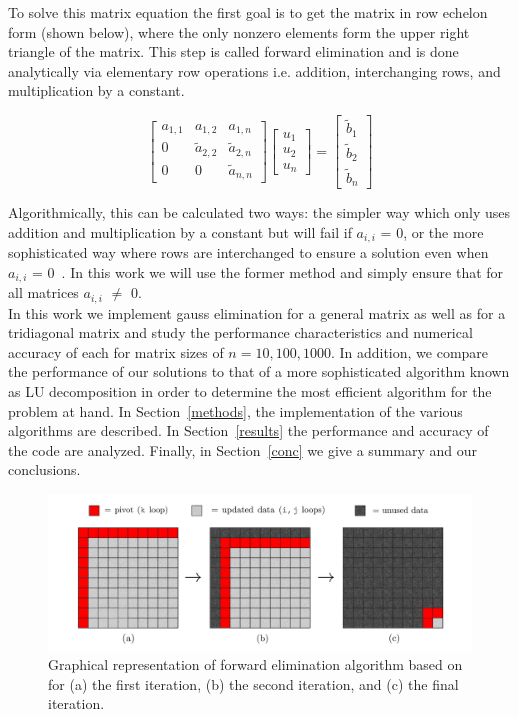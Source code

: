 \documentclass[prc,amsmath,twocolumn,superscriptaddress]{revtex4}
\begin{document}
To solve this matrix equation the first goal is to get the matrix in row echelon form (shown below), where the only nonzero elements form the upper right triangle of the matrix. This step is called forward elimination and is done analytically via elementary row operations i.e. addition, interchanging rows, and multiplication by a constant.

\begin{equation}
\begin{bmatrix} a_{1,1} & a_{1,2} &a_{1,n} \\ 0  & \tilde{a}_{2,2} &\tilde{a}_{2,n} \\ 0  & 0  &\tilde{a}_{n,n} \end{bmatrix}
\begin{bmatrix} u_1  \\ u_2\\ u_n \end{bmatrix}=\begin{bmatrix} \tilde{b}_1  \\ \tilde{b}_2\\ \tilde{b}_n \end{bmatrix}
\label{reduced}
\end{equation}

Algorithmically, this can be calculated two ways: the simpler way which only uses addition and multiplication by a constant but will fail if $a_{i,i}$ = 0, or the more sophisticated way where rows are interchanged to ensure a solution even when $a_{i,i}$ = 0~\cite{book}. In this work we will use the former method and simply ensure that for all matrices $a_{i,i}$ $\neq$ 0. \\

In this work we implement gauss elimination for a general matrix as well as for a tridiagonal matrix and study the performance characteristics and numerical accuracy of each for matrix sizes of $n=10,100,1000$. In addition, we compare the performance of our solutions to that of a more sophisticated algorithm known as LU decomposition in order to determine the most efficient algorithm for the problem at hand. In Section~\ref{methods}, the implementation of the various algorithms are described. In Section~\ref{results} the performance and accuracy of the code are analyzed. Finally, in Section~\ref{conc} we give a summary and our conclusions.

\begin{figure}[t]
\includegraphics[scale=0.2]{algorithm.jpg}
\caption{Graphical representation of forward elimination algorithm based on~\cite{graph} for (a) the first iteration, (b) the second iteration, and (c) the final iteration.}
\label{algorithm}
\end{figure}
\end{document}
